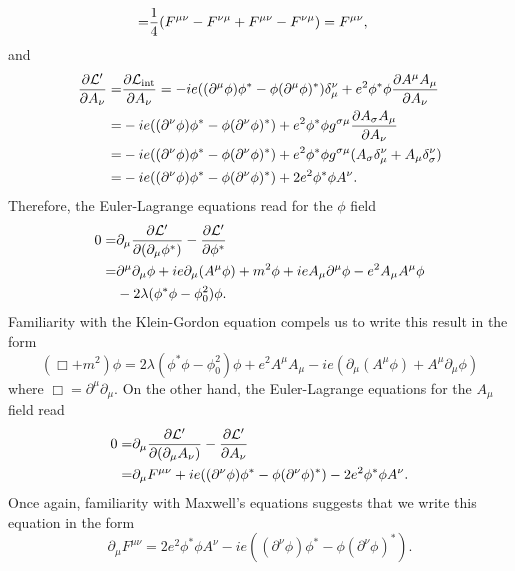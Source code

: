 \documentclass{article}
\begin{document}
\begin{enumerate}
\begin{enumerate}[(i)]
\begin{align}
\begin{split}
=&\frac{1}{4}\qty(F^{\mu\nu}-F^{\nu\mu}+F^{\mu\nu}-F^{\nu\mu})=F^{\mu\nu},
\end{split}
\end{align}
and
\begin{align}
\begin{split}
\pdv{\mathcal{L}'}{A_\nu}=&\pdv{\mathcal{L}_\text{int}}{A_\nu}=-ie((\partial^\mu\phi)\phi^*-\phi(\partial^\mu\phi)^*)\delta^\nu_\mu+e^2\phi^*\phi\pdv{A^\mu A_\mu}{A_\nu}\\
=&-ie((\partial^\nu\phi)\phi^*-\phi(\partial^\nu\phi)^*)+e^2\phi^*\phi g^{\sigma\mu}\pdv{A_\sigma A_\mu}{A_\nu}\\
=&-ie((\partial^\nu\phi)\phi^*-\phi(\partial^\nu\phi)^*)+e^2\phi^*\phi g^{\sigma\mu}(A_\sigma\delta^\nu_\mu+A_\mu\delta^\nu_\sigma)\\
=&-ie((\partial^\nu\phi)\phi^*-\phi(\partial^\nu\phi)^*)+2e^2\phi^*\phi A^\nu.
\end{split}
\end{align}
Therefore, the Euler-Lagrange equations read for the $\phi$ field
\begin{align}
\begin{split}
0=&\partial_\mu\pdv{\mathcal{L}'}{(\partial_\mu\phi^*)}-\pdv{\mathcal{L}'}{\phi^*}\\
=&\partial^\mu\partial_\mu\phi+ie\partial_\mu(A^\mu\phi)+m^2\phi+ieA_\mu\partial^\mu\phi-e^2A_\mu A^\mu\phi\\
&-2\lambda(\phi^*\phi-\phi_0^2)\phi.
\end{split}
\end{align}
Familiarity with the Klein-Gordon equation compels us to write this result in the form
\begin{equation}
(\Box + m^2)\phi=2\lambda(\phi^*\phi-\phi_0^2)\phi+e^2A^\mu A_\mu-ie(\partial_\mu(A^\mu\phi)+A^\mu\partial_\mu\phi)
\end{equation}
where $\Box=\partial^\mu\partial_\mu$. On the other hand, the Euler-Lagrange equations for the $A_\mu$ field read
\begin{align}
\begin{split}
0=&\partial_\mu\pdv{\mathcal{L}'}{(\partial_\mu A_\nu)}-\pdv{\mathcal{L}'}{A_\nu}\\
=&\partial_\mu F^{\mu\nu}+ie((\partial^\nu\phi)\phi^*-\phi(\partial^\nu\phi)^*)-2e^2\phi^*\phi A^\nu.
\end{split}
\end{align}
Once again, familiarity with Maxwell's equations suggests that we write this equation in the form
\begin{equation}\label{ec:Maxwell}
\partial_\mu F^{\mu\nu}=2e^2\phi^*\phi A^\nu-ie((\partial^\nu\phi)\phi^*-\phi(\partial^\nu\phi)^*).
\end{equation}


\end{enumerate}
\end{enumerate}
\end{document}
